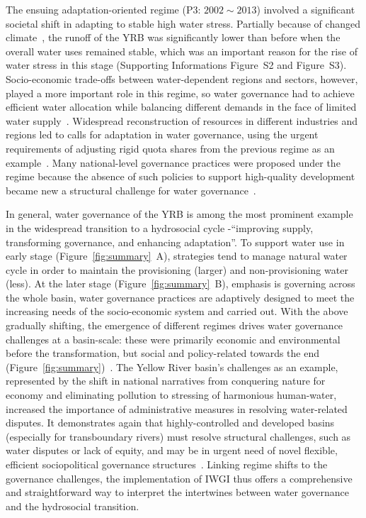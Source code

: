 \documentclass[draft]{../agujournal2019}
\begin{document}
The ensuing adaptation-oriented regime (P3: $2002 \sim 2013$) involved a significant societal shift in adapting to stable high water stress.
Partially because of changed climate~\cite{han2023,liu2020c}, the runoff of the YRB was significantly lower than before when the overall water uses remained stable, which was an important reason for the rise of water stress in this stage (Supporting Informations Figure~S2 and Figure~S3).
Socio-economic trade-offs between water-dependent regions and sectors, however, played a more important role in this regime, so water governance had to achieve efficient water allocation while balancing different demands in the face of limited water supply~\cite{dalin2015,song2022}.
Widespread reconstruction of resources in different industries and regions led to calls for adaptation in water governance, using the urgent requirements of adjusting rigid quota shares from the previous regime as an example~\cite{wang2019e}.
Many national-level governance practices were proposed under the regime because the absence of such policies to support high-quality development became new a structural challenge for water governance~\cite{konar2019}.

In general, water governance of the YRB is among the most prominent example in the widespread transition to a hydrosocial cycle -``improving supply, transforming governance, and enhancing adaptation''.
To support water use in early stage (Figure~\ref{fig:summary}~A), strategies tend to manage natural water cycle in order to maintain the provisioning (larger) and non-provisioning water (less).
At the later stage (Figure~\ref{fig:summary}~B), emphasis is governing across the whole basin, water governance practices are adaptively designed to meet the increasing needs of the socio-economic system and carried out.
With the above gradually shifting, the emergence of different regimes drives water governance challenges at a basin-scale: these were primarily economic and environmental before the transformation, but social and policy-related towards the end (Figure~\ref{fig:summary})~\cite{singh2019,porcher2019}.
The Yellow River basin's challenges as an example, represented by the shift in national narratives from conquering nature for economy and eliminating pollution to stressing of harmonious human-water, increased the importance of administrative measures in resolving water-related disputes.
It demonstrates again that highly-controlled and developed basins (especially for transboundary rivers) must resolve structural challenges, such as water disputes or lack of equity, and may be in urgent need of novel flexible, efficient sociopolitical governance structures~\cite{unep-dhi2016,mirumachi2015}.
Linking regime shifts to the governance challenges, the implementation of IWGI thus offers a comprehensive and straightforward way to interpret the intertwines between water governance and the hydrosocial transition.
\end{document}
